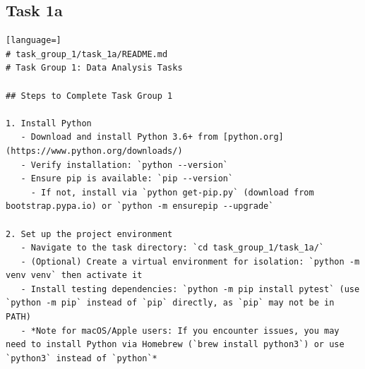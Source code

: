 \begin{appendices}
\begin{figure}[ht]
\setlength{\fboxsep}{5pt}
\centering
\begin{minipage}[t]{1\textwidth}
\end{minipage}
\end{figure}

\subsection{Task 1a}
\label{app:tg1a-code}
\begin{lstlisting}[language=]
# task_group_1/task_1a/README.md
# Task Group 1: Data Analysis Tasks

## Steps to Complete Task Group 1

1. Install Python
   - Download and install Python 3.6+ from [python.org](https://www.python.org/downloads/)
   - Verify installation: `python --version`
   - Ensure pip is available: `pip --version`
     - If not, install via `python get-pip.py` (download from bootstrap.pypa.io) or `python -m ensurepip --upgrade`

2. Set up the project environment
   - Navigate to the task directory: `cd task_group_1/task_1a/`
   - (Optional) Create a virtual environment for isolation: `python -m venv venv` then activate it
   - Install testing dependencies: `python -m pip install pytest` (use `python -m pip` instead of `pip` directly, as `pip` may not be in PATH)
   - *Note for macOS/Apple users: If you encounter issues, you may need to install Python via Homebrew (`brew install python3`) or use `python3` instead of `python`*


\end{lstlisting}
\end{appendices}
